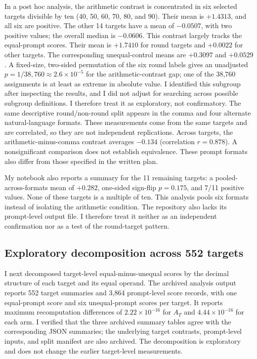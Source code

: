 \documentclass[11pt]{article}
\begin{document}
In a post hoc analysis, the arithmetic contrast is concentrated in six selected targets divisible by ten (40, 50, 60, 70, 80, and 90). Their mean is $+1.4313$, and all six are positive. The other 14 targets have a mean of $-0.0507$, with two positive values; the overall median is $-0.0606$. This contrast largely tracks the equal-prompt scores. Their mean is $+1.7410$ for round targets and $+0.0022$ for other targets. The corresponding unequal-control means are $+0.3097$ and $+0.0529$. A fixed-size, two-sided permutation of the six round labels gives an unadjusted $p=1/38{,}760\approx2.6\times10^{-5}$ for the arithmetic-contrast gap; one of the 38,760 assignments is at least as extreme in absolute value. I identified this subgroup after inspecting the results, and I did not adjust for searching across possible subgroup definitions. I therefore treat it as exploratory, not confirmatory. The same descriptive round/non-round split appears in the comma and four alternate natural-language formats. These measurements come from the same targets and are correlated, so they are not independent replications. Across targets, the arithmetic-minus-comma contrast averages $-0.134$ (correlation $r=0.878$). A nonsignificant comparison does not establish equivalence. These prompt formats also differ from those specified in the written plan.

My notebook also reports a summary for the 11 remaining targets: a pooled-across-formats mean of $+0.282$, one-sided sign-flip $p=0.175$, and 7/11 positive values. None of these targets is a multiple of ten. This analysis pools six formats instead of isolating the arithmetic condition. The repository also lacks its prompt-level output file. I therefore treat it neither as an independent confirmation nor as a test of the round-target pattern.

\subsection{Exploratory decomposition across 552 targets}

I next decomposed target-level equal-minus-unequal scores by the decimal structure of each target and its equal operand. The archived analysis output reports 552 target summaries and 3,864 prompt-level score records, with one equal-prompt score and six unequal-prompt scores per target. It reports maximum recomputation differences of $2.22\times10^{-16}$ for $A_T$ and $4.44\times10^{-16}$ for each arm. I verified that the three archived summary tables agree with the corresponding JSON summaries; the underlying target contrasts, prompt-level inputs, and split manifest are also archived. The decomposition is exploratory and does not change the earlier target-level measurements.
\end{document}
